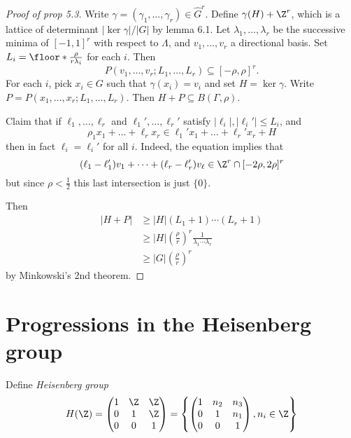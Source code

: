 \documentclass[a4paper]{article}
\begin{document}
\begin{proof}[Proof of prop 5.3]
  Write \(\gamma = (\gamma_1, \dots, \gamma_r) \in \hat G^r\). Define \(\gamma(H) + \Z^r\), which is a lattice of determinant \(|\ker \gamma|/|G|\) by lemma 6.1. Let \(\lambda_1, \dots, \lambda_r\) be the successive minima of \([-1, 1]^r\) with respect to \(\Lambda\), and \(v_1, \dots, v_r\) a directional basis. Set \(L_i = \floor*{\frac{\rho}{r\lambda_i}}\) for each \(i\). Then
  \[
    P(v_1, \dots, v_r; L_1, \dots, L_r) \subseteq [-\rho, \rho]^r.
  \]
  For each \(i\), pick \(x_i \in G\) such that \(\gamma(x_i) = v_i\) and set \(H = \ker \gamma\). Write \(P = P(x_1, \dots, x_r; L_1, \dots, L_r)\). Then \(H + P \subseteq B(\Gamma, \rho)\).

  Claim that if \(\ell_1, \dots, \ell_r\) and \(\ell_1', \dots, \ell_r'\) satisfy \(|\ell_i|, |\ell_i'| \leq L_i\), and
  \[
    \rho_1 x_1 + \dots + \ell_r x_r \in \ell_1' x_1 + \dots + \ell_r' x_r + H
  \]
  then in fact \(\ell_i = \ell_i'\) for all \(i\). Indeed, the equation implies that
  \[
    (\ell_1 - \ell_1') v_1 + \dots + (\ell_r - \ell_r') v_\ell \in \Z^r \cap [-2\rho, 2\rho]^r
  \]
  but since \(\rho < \frac{1}{2}\) this last intersection is just \(\{0\}\).

  Then
  \begin{align*}
    |H + P|
    &\geq |H| (L_1 + 1) \cdots (L_r + 1) \\
    &\geq |H| \left( \frac{\rho}{r} \right)^r \frac{1}{\lambda_1 \cdots \lambda_r} \\
    &\geq |G| \left( \frac{\rho}{r} \right)^r
  \end{align*}
  by Minkowski's 2nd theorem.
\end{proof}

\section*{Progressions in the Heisenberg group}

Define \emph{Heisenberg group}
\[
  H(\Z) =
  \begin{pmatrix}
    1 & \Z & \Z \\
    0 & 1 & \Z \\
    0 & 0 & 1
  \end{pmatrix}
  = \left\{
    \begin{pmatrix}
      1 & n_2 & n_3 \\
      0 & 1 & n_1 \\
      0 & 0 & 1
    \end{pmatrix}
    , n_i \in \Z
  \right\}
\]
\end{document}
